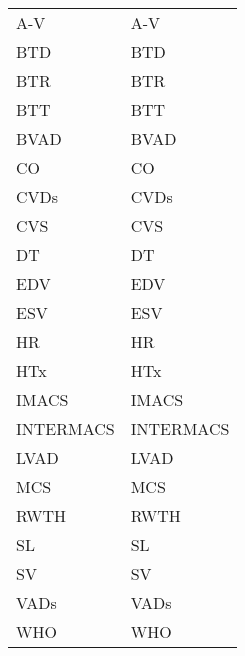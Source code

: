 \begin{tabularx}{\textwidth}{p{}X}
\acs{A-V} & \acl{A-V} \\
\acs{BTD} & \acl{BTD} \\
\acs{BTR} & \acl{BTR} \\
\acs{BTT} & \acl{BTT} \\
\acs{BVAD} & \acl{BVAD} \\
\acs{CO} & \acl{CO} \\
\acs{CVDs} & \acl{CVDs} \\
\acs{CVS} & \acl{CVS} \\
\acs{DT} & \acl{DT} \\
\acs{EDV} & \acl{EDV} \\
\acs{ESV} & \acl{ESV} \\
\acs{HR} & \acl{HR} \\
\acs{HTx} & \acl{HTx} \\
\acs{IMACS} & \acl{IMACS}\\
\acs{INTERMACS} & \acl{INTERMACS}\\
\acs{LVAD} & \acl{LVAD} \\
\acs{MCS} & \acl{MCS} \\
\acs{RWTH} & \acl{RWTH}\\
\acs{SL} & \acl{SL}\\
\acs{SV} & \acl{SV} \\
\acs{VADs} & \acl{VADs} \\
\acs{WHO} & \acl{WHO} \\
\end{tabularx}
%
%
%
%
%
